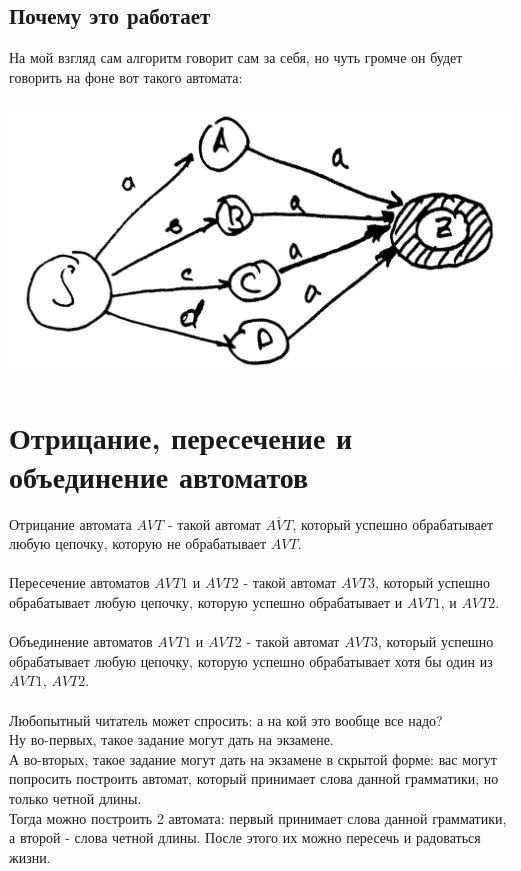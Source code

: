 \documentclass[14pt]{extreport}
\begin{document}
	\section{Почему это работает}
	На мой взгляд сам алгоритм говорит сам за себя, но чуть громче он будет говорить на фоне вот
	такого автомата:\\\\
	\includegraphics[scale=0.14]{data/pic4_3.png}
	\newpage
	\chapter{Отрицание, пересечение и объединение автоматов}
	Отрицание автомата $AVT$ - такой автомат $\overline{AVT}$, который успешно обрабатывает
	любую цепочку, которую не обрабатывает $AVT$.\\\\
	Пересечение автоматов $AVT1$ и $AVT2$ - такой автомат $AVT3$, который успешно обрабатывает
	любую цепочку, которую успешно обрабатывает и $AVT1$, и $AVT2$.\\\\
	Объединение автоматов $AVT1$ и $AVT2$ - такой автомат $AVT3$, который успешно обрабатывает
	любую цепочку, которую успешно обрабатывает хотя бы один из $AVT1$, $AVT2$.\\\\
	Любопытный читатель может спросить: а на кой это вообще все надо?\\
	Ну во-первых, такое задание могут дать на экзамене.\\
	А во-вторых, такое задание могут дать на экзамене в скрытой форме: вас могут попросить
	построить автомат, который принимает слова данной грамматики, но только четной длины.\\
	Тогда можно построить 2 автомата: первый принимает слова данной грамматики, а второй - слова
	четной длины. После этого их можно пересечь и радоваться жизни.
\end{document}
